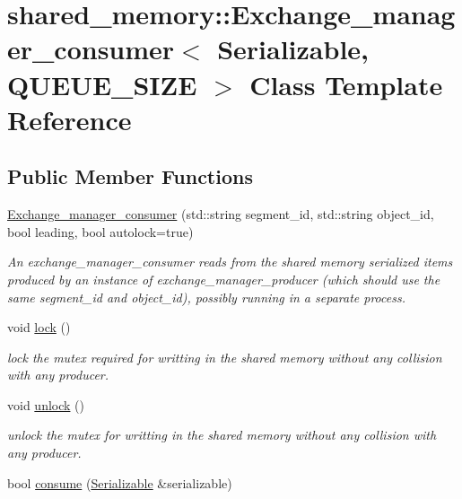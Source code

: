\hypertarget{classshared__memory_1_1Exchange__manager__consumer}{}\section{shared\+\_\+memory\+:\+:Exchange\+\_\+manager\+\_\+consumer$<$ Serializable, Q\+U\+E\+U\+E\+\_\+\+S\+I\+ZE $>$ Class Template Reference}
\label{classshared__memory_1_1Exchange__manager__consumer}
\subsection*{Public Member Functions}
\begin{DoxyCompactItemize}
\item 
\hyperlink{classshared__memory_1_1Exchange__manager__consumer_a15b2b91e57fb8c9c60ec354274edf20d}{Exchange\+\_\+manager\+\_\+consumer} (std\+::string segment\+\_\+id, std\+::string object\+\_\+id, bool leading, bool autolock=true)
\begin{DoxyCompactList}\small\item\em An exchange\+\_\+manager\+\_\+consumer reads from the shared memory serialized items produced by an instance of exchange\+\_\+manager\+\_\+producer (which should use the same segment\+\_\+id and object\+\_\+id), possibly running in a separate process. \end{DoxyCompactList}\item 
void \hyperlink{classshared__memory_1_1Exchange__manager__consumer_a1ec59bb41c9de78eb891ea70efe6b8c2}{lock} ()
\begin{DoxyCompactList}\small\item\em lock the mutex required for writting in the shared memory without any collision with any producer. \end{DoxyCompactList}\item 
void \hyperlink{classshared__memory_1_1Exchange__manager__consumer_aaf053702ec1ef8455fc10e70144f6923}{unlock} ()
\begin{DoxyCompactList}\small\item\em unlock the mutex for writting in the shared memory without any collision with any producer. \end{DoxyCompactList}\item 
bool \hyperlink{classshared__memory_1_1Exchange__manager__consumer_ae3e006de034b55e328784d3eacfb1772}{consume} (\hyperlink{classSerializable}{Serializable} \&serializable)

\end{DoxyCompactItemize}
